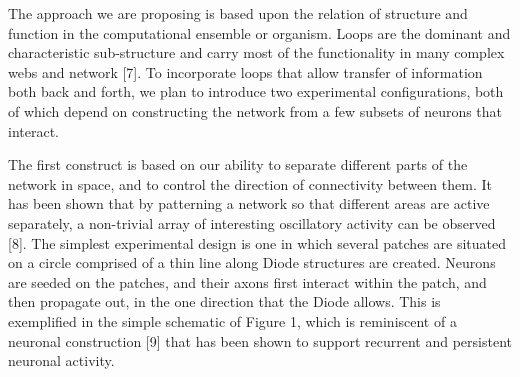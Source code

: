 The approach we are proposing is based upon the relation of structure and function in the computational ensemble or organism. Loops are the dominant and characteristic sub-structure and carry most of the functionality in many complex webs and network [7]. To incorporate loops that allow transfer of information both back and forth, we plan to introduce two experimental configurations, both of which depend on constructing the network from a few subsets of neurons that interact.

The first construct is based on our ability to separate different parts of the network in space, and to control the direction of connectivity between them.  It has been shown that by patterning a network so that different areas are active separately, a non-trivial array of interesting oscillatory activity can be observed [8]. The simplest experimental design is one in which several patches are situated on a circle comprised of a thin line along Diode structures are created. Neurons are seeded on the patches, and their axons first interact within the patch, and then propagate out, in the one direction that the Diode allows. This is exemplified in the simple schematic of Figure 1, which is reminiscent of a neuronal construction [9] that has been shown to support recurrent and persistent neuronal activity.

